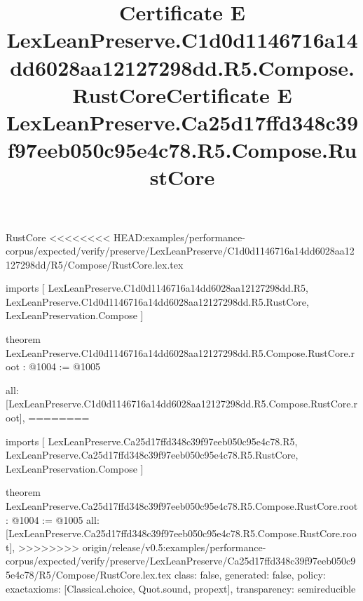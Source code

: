\begin{lexlean}{RustCore}
<<<<<<<< HEAD:examples/performance-corpus/expected/verify/preserve/LexLeanPreserve/C1d0d1146716a14dd6028aa12127298dd/R5/Compose/RustCore.lex.tex
\title{Certificate E LexLeanPreserve.C1d0d1146716a14dd6028aa12127298dd.R5.Compose.RustCore}
\begin{coremodule}
imports [
  LexLeanPreserve.C1d0d1146716a14dd6028aa12127298dd.R5,
  LexLeanPreserve.C1d0d1146716a14dd6028aa12127298dd.R5.RustCore,
  LexLeanPreservation.Compose
]

theorem LexLeanPreserve.C1d0d1146716a14dd6028aa12127298dd.R5.Compose.RustCore.root : @1004 := @1005 {
  all: [LexLeanPreserve.C1d0d1146716a14dd6028aa12127298dd.R5.Compose.RustCore.root],
========
\title{Certificate E LexLeanPreserve.Ca25d17ffd348c39f97eeb050c95e4c78.R5.Compose.RustCore}
\begin{coremodule}
imports [
  LexLeanPreserve.Ca25d17ffd348c39f97eeb050c95e4c78.R5,
  LexLeanPreserve.Ca25d17ffd348c39f97eeb050c95e4c78.R5.RustCore,
  LexLeanPreservation.Compose
]

theorem LexLeanPreserve.Ca25d17ffd348c39f97eeb050c95e4c78.R5.Compose.RustCore.root : @1004 := @1005 {
  all: [LexLeanPreserve.Ca25d17ffd348c39f97eeb050c95e4c78.R5.Compose.RustCore.root],
>>>>>>>> origin/release/v0.5:examples/performance-corpus/expected/verify/preserve/LexLeanPreserve/Ca25d17ffd348c39f97eeb050c95e4c78/R5/Compose/RustCore.lex.tex
  class: false,
  generated: false,
  policy: exact{axioms: [Classical.choice, Quot.sound, propext]},
  transparency: semireducible
}


\end{coremodule}}
\end{coremodule}
\end{lexlean}
